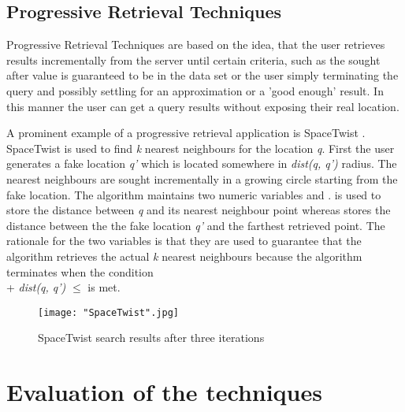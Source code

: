 \documentclass[english]{tktltiki2}
\theoremstyle{definition}
\theoremstyle{remark}
\begin{document}
\subsection{Progressive Retrieval Techniques}

Progressive Retrieval Techniques are based on the idea, that the user retrieves results incrementally from the server until certain criteria, such as the sought after value is guaranteed to be in the data set or the user simply terminating the query and possibly settling for an approximation or a 'good enough' result. In this manner the user can get a query results without exposing their real location. \par

A prominent example of a progressive retrieval application is SpaceTwist \cite{SpaceTwist}. SpaceTwist is used to find \textit{k} nearest neighbours for the location \textit{q}. First the user generates a fake location \textit{q'} which is located somewhere in \textit{dist(q, q')} radius. The nearest neighbours are sought incrementally in a growing circle starting from the fake location. The algorithm maintains two numeric variables \textgamma \hspace{1mm} and \texttau. \textgamma \hspace{1mm} is used to store the distance between \textit{q} and its nearest neighbour point whereas \texttau \hspace{1mm} stores the distance between the the fake location \textit{q'} and the farthest retrieved point. The rationale for the two variables is that they are used to guarantee that the algorithm retrieves the actual \textit{k} nearest neighbours because the algorithm terminates when the condition \\ \textgamma \hspace{1mm} + \textit{dist(q, q')} \( \leq \) \texttau \hspace{1mm} is met.

\begin{figure}[ht!]
\centering
{}
\texttt{[image: "SpaceTwist".jpg]}
\caption{SpaceTwist search results after three iterations}
\label{fig:SpaceTwist}
\end{figure} 

\section{Evaluation of the techniques}


%
%
% 
%







% 
\end{document}
